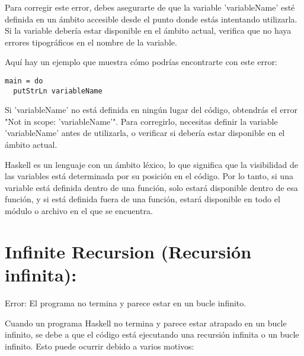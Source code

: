 \documentclass{article}
\begin{document}
Para corregir este error, debes asegurarte de que la variable 'variableName' esté definida en un ámbito accesible desde el punto donde estás intentando utilizarla. Si la variable debería estar disponible en el ámbito actual, verifica que no haya errores tipográficos en el nombre de la variable.

Aquí hay un ejemplo que muestra cómo podrías encontrarte con este error:

\begin{verbatim}
main = do
  putStrLn variableName
\end{verbatim}

Si 'variableName' no está definida en ningún lugar del código, obtendrás el error "Not in scope: 'variableName'". Para corregirlo, necesitas definir la variable 'variableName' antes de utilizarla, o verificar si debería estar disponible en el ámbito actual.

Haskell es un lenguaje con un ámbito léxico, lo que significa que la visibilidad de las variables está determinada por su posición en el código. Por lo tanto, si una variable está definida dentro de una función, solo estará disponible dentro de esa función, y si está definida fuera de una función, estará disponible en todo el módulo o archivo en el que se encuentra.


\section{Infinite Recursion (Recursión infinita):}

\begin{mdframed}[backgroundcolor=red!40,shadow=true,shadowsize=2pt,roundcorner=2pt]
    Error: El programa no termina y parece estar en un bucle infinito.
\end{mdframed}

Cuando un programa Haskell no termina y parece estar atrapado en un bucle infinito, se debe a que el código está ejecutando una recursión infinita o un bucle infinito. Esto puede ocurrir debido a varios motivos:
\end{document}

